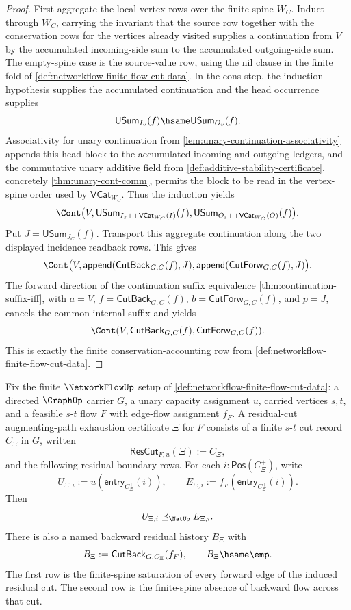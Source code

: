 \begin{proof}
First aggregate the local vertex rows over the finite spine $W_C$. Induct through $W_C$, carrying the invariant that the source row together with the conservation rows for the vertices already visited supplies a continuation from $V$ by the accumulated incoming-side sum to the accumulated outgoing-side sum. The empty-spine case is the source-value row, using the nil clause in the finite fold of \autoref{def:networkflow-finite-flow-cut-data}. In the cons step, the induction hypothesis supplies the accumulated continuation and the head occurrence supplies
$$
\mathsf{USum}_{I_v}(f)\hsame\mathsf{USum}_{O_v}(f).
$$
Associativity for unary continuation from \autoref{lem:unary-continuation-associativity} appends this head block to the accumulated incoming and outgoing ledgers, and the commutative unary additive field from \autoref{def:additive-stability-certificate}, concretely \autoref{thm:unary-cont-comm}, permits the block to be read in the vertex-spine order used by $\mathsf{VCat}_{W_C}$. Thus the induction yields
$$
\Cont
\bigl(
V,
\mathsf{USum}_{I_s{++}\mathsf{VCat}_{W_C}(I)}(f),
\mathsf{USum}_{O_s{++}\mathsf{VCat}_{W_C}(O)}(f)
\bigr).
$$
Put $J=\mathsf{USum}_{J_C}(f)$. Transport this aggregate continuation along the two displayed incidence readback rows. This gives
$$
\Cont
\bigl(
V,
\mathsf{append}(\mathsf{CutBack}_{G,C}(f),J),
\mathsf{append}(\mathsf{CutForw}_{G,C}(f),J)
\bigr).
$$
The forward direction of the continuation suffix equivalence \autoref{thm:continuation-suffix-iff}, with $a=V$, $f=\mathsf{CutBack}_{G,C}(f)$, $b=\mathsf{CutForw}_{G,C}(f)$, and $p=J$, cancels the common internal suffix and yields
$$
\Cont(V,\mathsf{CutBack}_{G,C}(f),\mathsf{CutForw}_{G,C}(f)).
$$
This is exactly the finite conservation-accounting row from \autoref{def:networkflow-finite-flow-cut-data}.
\end{proof}

\begin{definition}
\label{def:networkflow-residual-cut-augmenting-exhaustion-certificate}
Fix the finite $\NetworkFlowUp$ setup of \autoref{def:networkflow-finite-flow-cut-data}: a directed $\GraphUp$ carrier $G$, a unary capacity assignment $u$, carried vertices $s,t$, and a feasible $s$-$t$ flow $F$ with edge-flow assignment $f_F$. A residual-cut augmenting-path exhaustion certificate $\Xi$ for $F$ consists of a finite $s$-$t$ cut record $C_\Xi$ in $G$, written
$$
\mathsf{ResCut}_{F,u}(\Xi):=C_\Xi,
$$
and the following residual boundary rows. For each $i:\mathsf{Pos}(C_\Xi^{+})$, write
$$
U_{\Xi,i}:=u(\mathsf{entry}_{C_\Xi^{+}}(i)),
\qquad
E_{\Xi,i}:=f_F(\mathsf{entry}_{C_\Xi^{+}}(i)).
$$
Then
$$
U_{\Xi,i}
\preceq_{\NatUp}
E_{\Xi,i}.
$$
There is also a named backward residual history $B_\Xi$ with
$$
B_\Xi:=\mathsf{CutBack}_{G,C_\Xi}(f_F),
\qquad
B_\Xi\hsame\emp.
$$
The first row is the finite-spine saturation of every forward edge of the induced residual cut. The second row is the finite-spine absence of backward flow across that cut.
\end{definition}

